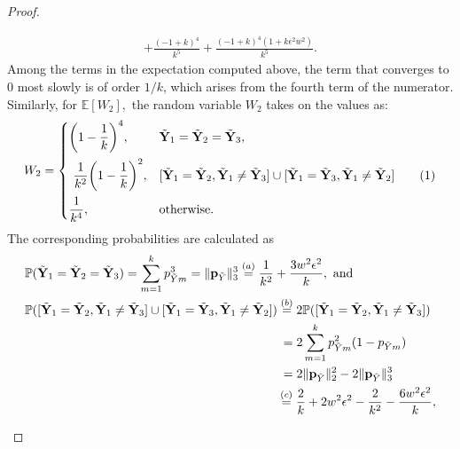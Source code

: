 \documentclass[twoside,11pt]{article}
\newcommand\numberthis{\addtocounter{equation}{1}\tag{\theequation}}
\newcommand{\rvTwo}{Y}
\newcommand{\vectorize}[1]{\mathbf{#1}}
\newcommand{\mP}{\mathbb{P}} %
\newcommand{\alphabetSize}{k} %
\newcommand{\vectorIndex}{m}
\newcommand{\probVecElement}[2]{p_{{#1}{#2}}}
\newcommand{\probVec}{\mathbf{p}} %
\begin{document}
\begin{appendix}
\begin{proof}
\begin{itemize}
\begin{itemize}
\begin{align*}
				+
				\frac{(-1 + k)^4}{k^5}
				+
				\frac{(-1 + k)^4 (1 + k\epsilon^2  w^2)}{k^5}.
			\end{align*}
			Among the terms in the expectation computed above,
			the term that converges to 0 most slowly is of order
			$1/\alphabetSize$, which arises from the fourth term of the numerator. 
			Similarly, for
			$
			\mathbb{E}[W_2],
			$
			the random variable $W_2$ takes on the values as:
			\begin{align*}
				W_2
				=
				\begin{cases}
					\biggl(1-\dfrac{1}{\alphabetSize}\biggr)^4, & 
					\tilde{\vectorize{\rvTwo}}_1
					=
					\tilde{\vectorize{\rvTwo}}_2
					=
					\tilde{\vectorize{\rvTwo}}_3,
					\\[1em]
					~\dfrac{1}{\alphabetSize^2}
					\biggl(1-\dfrac{1}{\alphabetSize}\biggr)^2, & 
					[\tilde{\vectorize{\rvTwo}}_1 = \tilde{\vectorize{\rvTwo}}_2,
					\tilde{\vectorize{\rvTwo}}_1 \neq
					\tilde{\vectorize{\rvTwo}}_3]
					\cup
					[\tilde{\vectorize{\rvTwo}}_1 = \tilde{\vectorize{\rvTwo}}_3,
					\tilde{\vectorize{\rvTwo}}_1 \neq
					\tilde{\vectorize{\rvTwo}}_2]
					\numberthis
					\label{kernel_three_genrr}
					\\[1em]
					\dfrac{1}{\alphabetSize^4}, & \text{otherwise.}
				\end{cases}	 
			\end{align*}
			The corresponding probabilities are calculated as
			\begin{align*}
				& \mP(\tilde{\vectorize{\rvTwo}}_1
				=
				\tilde{\vectorize{\rvTwo}}_2
				=
				\tilde{\vectorize{\rvTwo}}_3)
				=
				\sum_{\vectorIndex = 1}^\alphabetSize
				\probVecElement{\tilde{\rvTwo}}{\vectorIndex}^3
				=
				\|\probVec_{\tilde{\rvTwo}}\|_3^3
				\stackrel{(a)}{=}
				\frac{1}{\alphabetSize^2}
				+
				\frac{3 w^2 \epsilon^2}{\alphabetSize},~\text{and}
				\\
				& \mP([\tilde{\vectorize{\rvTwo}}_1 = \tilde{\vectorize{\rvTwo}}_2,
				\tilde{\vectorize{\rvTwo}}_1 \neq
				\tilde{\vectorize{\rvTwo}}_3]
				\cup
				[\tilde{\vectorize{\rvTwo}}_1 = \tilde{\vectorize{\rvTwo}}_3,
				\tilde{\vectorize{\rvTwo}}_1 \neq
				\tilde{\vectorize{\rvTwo}}_2])
				\stackrel{(b)}{=}
				2
				\mP([\tilde{\vectorize{\rvTwo}}_1 = \tilde{\vectorize{\rvTwo}}_2,
				\tilde{\vectorize{\rvTwo}}_1 \neq
				\tilde{\vectorize{\rvTwo}}_3])
				\\& \hskip 20.6em =
				2\sum_{\vectorIndex=1}^\alphabetSize
				\probVecElement{\tilde{\rvTwo}}{\vectorIndex}^2
				(1-\probVecElement{\tilde{\rvTwo}}{\vectorIndex})
				\\& \hskip 20.6em =
				2\|\probVec_{\tilde{\rvTwo}}\|_2^2-
				2\|\probVec_{\tilde{\rvTwo}}\|_3^3
				\\& \hskip 20.35em \stackrel{(c)}{=}
				\frac{2}{\alphabetSize}
				+
				2w^2 \epsilon^2
				-
				\frac{2}{\alphabetSize^2}
				-
				\frac{6 w^2 \epsilon^2}{\alphabetSize}
				,
			\end{align*}
			

\end{itemize}
\end{itemize}
\end{proof}
\end{appendix}
\end{document}
